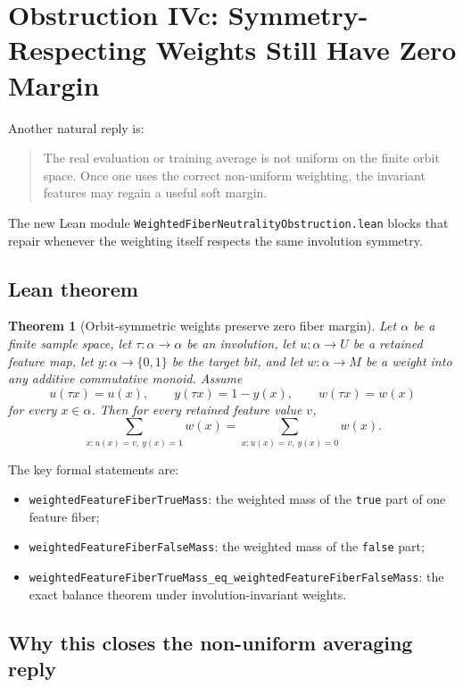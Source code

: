 \documentclass[11pt]{article}
\newtheorem{theorem}{Theorem}[section]
\theoremstyle{remark}
\begin{document}
\section{Obstruction IVc: Symmetry-Respecting Weights Still Have Zero Margin}

Another natural reply is:
\begin{quote}
The real evaluation or training average is not uniform on the finite orbit space.  Once one uses
the correct non-uniform weighting, the invariant features may regain a useful soft margin.
\end{quote}

The new Lean module \texttt{WeightedFiberNeutralityObstruction.lean} blocks that repair whenever
the weighting itself respects the same involution symmetry.

\subsection{Lean theorem}

\begin{theorem}[Orbit-symmetric weights preserve zero fiber margin]
Let \(\alpha\) be a finite sample space, let \(\tau : \alpha \to \alpha\) be an involution, let
\(u : \alpha \to U\) be a retained feature map, let \(y : \alpha \to \{0,1\}\) be the target bit,
and let \(w : \alpha \to M\) be a weight into any additive commutative monoid.  Assume
\[
  u(\tau x) = u(x), \qquad y(\tau x) = 1-y(x), \qquad w(\tau x) = w(x)
\]
for every \(x \in \alpha\).  Then for every retained feature value \(v\),
\[
  \sum_{x : u(x)=v,\ y(x)=1} w(x)
  =
  \sum_{x : u(x)=v,\ y(x)=0} w(x).
\]
\end{theorem}

\noindent
The key formal statements are:
\begin{itemize}[leftmargin=1.5em]
  \item \texttt{weightedFeatureFiberTrueMass}: the weighted mass of the \texttt{true} part of one
  feature fiber;
  \item \texttt{weightedFeatureFiberFalseMass}: the weighted mass of the \texttt{false} part;
  \item \texttt{weightedFeatureFiberTrueMass\_eq\_weightedFeatureFiberFalseMass}: the exact balance
  theorem under involution-invariant weights.
\end{itemize}

\subsection{Why this closes the non-uniform averaging reply}
\end{document}
